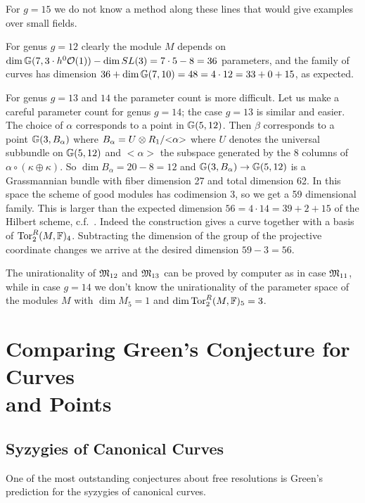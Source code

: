 \medskip
For $g=15$ we do not know a method along these lines that 
would give examples over small fields.



For genus $g=12$ clearly the module $M$ depends on 
$\dim{\mathbb G}(7,3 \cdot h^0{\mathcal O}(1))-\dim SL(3)= 7\cdot5-8=36$ parameters, 
and the family of curves has dimension $36+\dim{\mathbb G}(7,10)=48=4\cdot12=33+0+15$,
as expected. 

For genus $g=13$ and $14$ the parameter count is more difficult.
Let us make a careful parameter count for genus $g=14$;
the case $g=13$ is similar and easier.
The choice of $\alpha$ corresponds to a point in ${\mathbb G}(5,12)$.
Then $\beta$ corresponds to a point ${\mathbb G}(3,B_\alpha)$ where 
$B_\alpha = U \otimes R_1/{<}\alpha{>}$ where $U$ denotes
the universal subbundle on ${\mathbb G}(5,12)$ and ${<}\alpha{>}$ 
the subspace generated by the 8 columns of $\alpha\circ(\kappa \oplus \kappa)$. 
So $\dim B_\alpha = 20-8=12$ and ${\mathbb G}(3,B_\alpha) \to {\mathbb G}(5,12)$ 
is a Grassmannian bundle with fiber dimension 27 and total dimension 62. 
In this space the scheme of good modules has codimension 3, 
so we get a 59 dimensional family. 
This is larger than the expected dimension $56=4\cdot 14=39+2+15$ 
of the Hilbert scheme, c.f.~\cite{CO:Ha2}. 
Indeed the construction gives a curve together
with a basis of ${\rm{Tor}}_2^R(M,{\mathbb F})_4$. 
Subtracting the dimension of the group of the projective coordinate changes 
we arrive at the desired dimension $59-3=56$. 

The unirationality of $\mathfrak M_{12}$ and $\mathfrak M_{13}$ can be proved by computer 
as in case $\mathfrak M_{11}$, 
while in case $g=14$ we don't know the unirationality of 
the parameter space of the modules $M$ with 
$\dim M_5=1$ and $\dim {\rm{Tor}}^R_2(M,{\mathbb F})_5=3$.

\section[Comparing Green's Conjecture for Curves and Points]
	{Comparing Green's Conjecture for Curves \\ and Points}

\subsection{Syzygies of Canonical Curves}
One of the most outstanding conjectures about free resolutions is 
Green's prediction
for the syzygies of canonical curves. 

